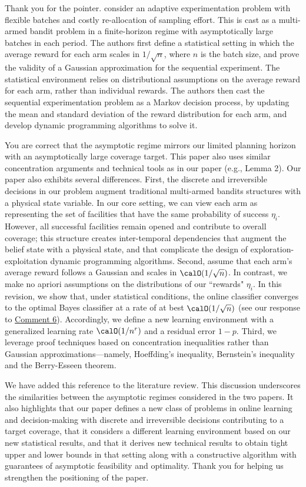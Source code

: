 \documentclass[11pt]{article}
\begin{document}
Thank you for the pointer. \cite{che2023adaptive} consider an adaptive experimentation problem with flexible batches and costly re-allocation of sampling effort. This is cast as a multi-armed bandit problem in a finite-horizon regime with asymptotically large batches in each period. The authors first define a statistical setting in which the average reward for each arm scales in $1/\sqrt n$, where $n$ is the batch size, and prove the validity of a Gaussian approximation for the sequential experiment. The statistical environment relies on distributional assumptions on the average reward for each arm, rather than individual rewards. The authors then cast the sequential experimentation problem as a Markov decision process, by updating the mean and standard deviation of the reward distribution for each arm, and develop dynamic programming algorithms to solve it.

You are correct that the asymptotic regime mirrors our limited planning horizon with an asymptotically large coverage target. This paper also uses similar concentration arguments and technical tools as in our paper (e.g., Lemma 2). Our paper also exhibits several differences. First, the discrete and irreversible decisions in our problem augment traditional multi-armed bandits structures with a physical state variable. In our core setting, we can view each arm as representing the set of facilities that have the same probability of success $\eta_{i}$. However, all successful facilities remain opened and contribute to overall coverage; this structure creates inter-temporal dependencies that augment the belief state with a physical state, and that complicate the design of exploration-exploitation dynamic programming algorithms. Second, \cite{che2023adaptive} assume that each arm's average reward follows a Gaussian and scales in $\calO(1/\sqrt n)$. In contrast, we make no apriori assumptions on the distributions of our ``rewards" $\eta_i$. In this revision, we show that, under statistical conditions, the online classifier converges to the optimal Bayes classifier at a rate of at best $\calO(1/\sqrt{n})$ (see our response to \hyperref[R1:6]{\color{blue}Comment 6}). Accordingly, we define a new learning environment with a generalized learning rate $\calO(1/n^r)$ and a residual error $1-p$. Third, we leverage proof techniques based on concentration inequalities rather than Gaussian approximations---namely, Hoeffding's inequality, Bernstein's inequality and the Berry-Esseen theorem.

We have added this reference to the literature review. This discussion underscores the similarities between the asymptotic regimes considered in the two papers. It also highlights that our paper defines a new class of problems in online learning and decision-making with discrete and irreversible decisions contributing to a target coverage, that it considers a different learning environment based on our new statistical results, and that it derives new technical results to obtain tight upper and lower bounds in that setting along with a constructive algorithm with guarantees of asymptotic feasibility and optimality. Thank you for helping us strengthen the positioning of the paper.
\end{document}

